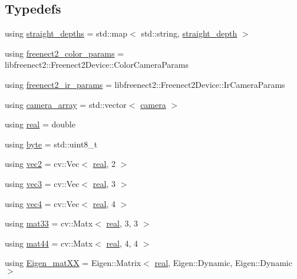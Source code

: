 \subsection*{Typedefs}
\begin{DoxyCompactItemize}
\item 
using \hyperlink{namespacetlz_a392186cdaba07f801aec55b464ccbc0b}{straight\+\_\+depths} = std\+::map$<$ std\+::string, \hyperlink{structtlz_1_1straight__depth}{straight\+\_\+depth} $>$
\item 
using \hyperlink{namespacetlz_a5c4bcd0a7cbf071e65a2a4fc68850282}{freenect2\+\_\+color\+\_\+params} = libfreenect2\+::\+Freenect2\+Device\+::\+Color\+Camera\+Params
\item 
using \hyperlink{namespacetlz_af1f29fddd4d7619e1c21a8a532ff67ef}{freenect2\+\_\+ir\+\_\+params} = libfreenect2\+::\+Freenect2\+Device\+::\+Ir\+Camera\+Params
\item 
using \hyperlink{namespacetlz_a7c35ad93fe55f736afafa798f3885c8e}{camera\+\_\+array} = std\+::vector$<$ \hyperlink{structtlz_1_1camera}{camera} $>$
\item 
using \hyperlink{namespacetlz_a15fd37cce97f2b8b606af18c2615f602}{real} = double
\item 
using \hyperlink{namespacetlz_afbec730d64767e794a689352d41b2b18}{byte} = std\+::uint8\+\_\+t
\item 
using \hyperlink{namespacetlz_ae192989bfbe6c700ac84d2a8cf05ebb4}{vec2} = cv\+::\+Vec$<$ \hyperlink{namespacetlz_a15fd37cce97f2b8b606af18c2615f602}{real}, 2 $>$
\item 
using \hyperlink{namespacetlz_ad0646d752ddb9d40d702d40cc6dc54a1}{vec3} = cv\+::\+Vec$<$ \hyperlink{namespacetlz_a15fd37cce97f2b8b606af18c2615f602}{real}, 3 $>$
\item 
using \hyperlink{namespacetlz_a21f82d5e23125980dc143404656a5c90}{vec4} = cv\+::\+Vec$<$ \hyperlink{namespacetlz_a15fd37cce97f2b8b606af18c2615f602}{real}, 4 $>$
\item 
using \hyperlink{namespacetlz_a6679497d5121f319147594e1f344ef57}{mat33} = cv\+::\+Matx$<$ \hyperlink{namespacetlz_a15fd37cce97f2b8b606af18c2615f602}{real}, 3, 3 $>$
\item 
using \hyperlink{namespacetlz_a56693a40f2ef608241dddb9064281089}{mat44} = cv\+::\+Matx$<$ \hyperlink{namespacetlz_a15fd37cce97f2b8b606af18c2615f602}{real}, 4, 4 $>$
\item 
using \hyperlink{namespacetlz_a5be0c2718335705e53acaa3de54120a1}{Eigen\+\_\+mat\+XX} = Eigen\+::\+Matrix$<$ \hyperlink{namespacetlz_a15fd37cce97f2b8b606af18c2615f602}{real}, Eigen\+::\+Dynamic, Eigen\+::\+Dynamic $>$

\end{DoxyCompactItemize}

